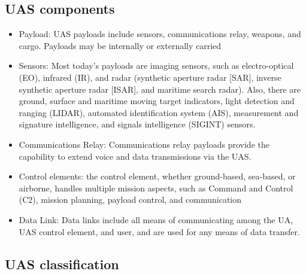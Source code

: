 \subsection{UAS components} 
\begin{itemize}

\item Payload:  UAS payloads include sensors, communications relay, weapons, and cargo. Payloads may be internally or externally carried 
\item Sensors: Most today’s payloads are imaging sensors, such as electro-optical (EO), infrared (IR), and radar (synthetic aperture radar [SAR], inverse synthetic aperture radar [ISAR], and maritime search radar). Also, there are ground, surface and maritime moving target indicators, light detection and ranging (LIDAR), automated identification system (AIS), measurement and signature intelligence, and signals intelligence (SIGINT) sensors. 
\item Communications Relay: Communications relay payloads provide the capability to extend voice and data transmissions via the UAS. 
\item Control elements: the control element, whether ground-based, sea-based, or airborne, handles multiple mission aspects, such as Command and Control (C2), mission planning, payload control, and communication 
\item Data Link: Data links include all means of communicating among the UA, UAS control element, and user, and are used for any means of data transfer. \cite{Joint}
\end{itemize}

\subsection{UAS classification}
